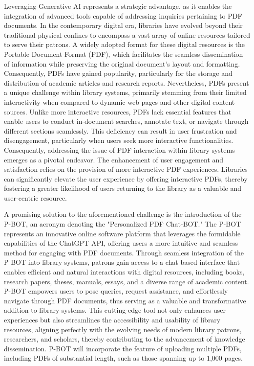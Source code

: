 \documentclass[fleqn,10pt]{thescipub} %
\begin{document}
Leveraging Generative AI represents a strategic advantage, as it enables the integration of advanced tools capable of addressing inquiries pertaining to PDF documents. In the contemporary digital era, libraries have evolved beyond their traditional physical confines to encompass a vast array of online resources tailored to serve their patrons. A widely adopted format for these digital resources is the Portable Document Format (PDF), which facilitates the seamless dissemination of information while preserving the original document's layout and formatting. Consequently, PDFs have gained popularity, particularly for the storage and distribution of academic articles and research reports. Nevertheless, PDFs present a unique challenge within library systems, primarily stemming from their limited interactivity when compared to dynamic web pages and other digital content sources. Unlike more interactive resources, PDFs lack essential features that enable users to conduct in-document searches, annotate text, or navigate through different sections seamlessly. This deficiency can result in user frustration and disengagement, particularly when users seek more interactive functionalities. Consequently, addressing the issue of PDF interaction within library systems emerges as a pivotal endeavor. The enhancement of user engagement and satisfaction relies on the provision of more interactive PDF experiences. Libraries can significantly elevate the user experience by offering interactive PDFs, thereby fostering a greater likelihood of users returning to the library as a valuable and user-centric resource.

A promising solution to the aforementioned challenge is the introduction of the P-BOT, an acronym denoting the "Personalized PDF Chat-BOT." The P-BOT represents an innovative online software platform that leverages the formidable capabilities of the ChatGPT API, offering users a more intuitive and seamless method for engaging with PDF documents. Through seamless integration of the P-BOT into library systems, patrons gain access to a chat-based interface that enables efficient and natural interactions with digital resources, including books, research papers, theses, manuals, essays, and a diverse range of academic content. P-BOT empowers users to pose queries, request assistance, and effortlessly navigate through PDF documents, thus serving as a valuable and transformative addition to library systems. This cutting-edge tool not only enhances user experiences but also streamlines the accessibility and usability of library resources, aligning perfectly with the evolving needs of modern library patrons, researchers, and scholars, thereby contributing to the advancement of knowledge dissemination. P-BOT will incorporate the feature of uploading multiple PDFs, including PDFs of substantial length, such as those spanning up to 1,000 pages.
\end{document}
